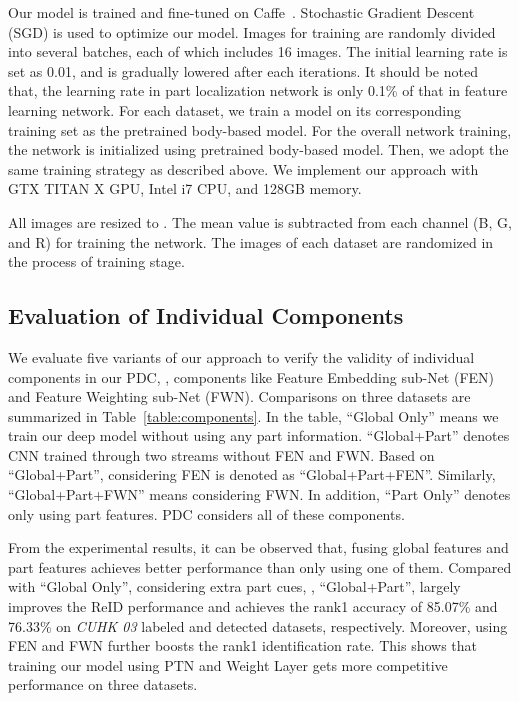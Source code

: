 \documentclass[10pt,twocolumn,letterpaper]{article}
\begin{document}
Our model is trained and fine-tuned on Caffe~\cite{jia2014caffe}. Stochastic Gradient Descent (SGD) is used to optimize our model. Images for training are randomly divided into several batches, each of which includes 16 images. The initial learning rate is set as 0.01, and is gradually lowered after each  iterations. It should be noted that, the learning rate in part localization network is only 0.1\% of that in feature learning network. For each dataset, we train a model on its corresponding training set as the pretrained body-based model. For the overall network training, the network is initialized using pretrained body-based model. Then, we adopt the same training strategy as described above. We implement our approach with GTX TITAN X GPU, Intel i7 CPU, and 128GB memory.

All images are resized to . The mean value is subtracted from each channel (B, G, and R) for training the network. The images of each dataset are randomized in the process of training stage.



\subsection{Evaluation of Individual Components}
\label{sec:component}

We evaluate five variants of our approach to verify the validity of individual components in our PDC, \eg, components like Feature Embedding sub-Net (FEN) and Feature Weighting sub-Net (FWN). Comparisons on three datasets are summarized in Table~\ref{table:components}. In the table, ``Global Only'' means we train our deep model without using any part information. ``Global+Part'' denotes CNN trained through two streams without FEN and FWN. Based on ``Global+Part'', considering FEN is denoted as ``Global+Part+FEN''. Similarly, ``Global+Part+FWN'' means considering FWN. In addition, ``Part Only'' denotes only using part features. PDC considers all of these components.

From the experimental results, it can be observed that, fusing global features and part features achieves better performance than only using one of them. Compared with ``Global Only'', considering extra part cues, \ie, ``Global+Part'', largely improves the ReID performance and achieves the rank1 accuracy of 85.07\% and 76.33\% on \emph{CUHK 03} labeled and detected datasets, respectively. Moreover, using FEN and FWN further boosts the rank1 identification rate. This shows that training our model using PTN and Weight Layer gets more competitive performance on three datasets.
\end{document}
